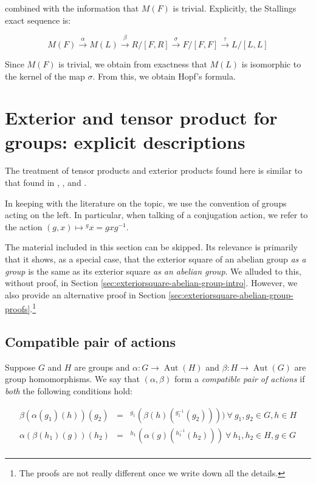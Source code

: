 \documentclass{ucetd}
\begin{document}
combined with the information that $M(F)$ is trivial. Explicitly,
the Stallings exact sequence is:

$$M(F) \stackrel{\alpha}{\to} M(L) \stackrel{\beta}{\to} R/[F,R] \stackrel{\sigma}{\to} F/[F,F] \stackrel{\tau}{\to} L/[L,L]$$

Since $M(F)$ is trivial, we obtain from exactness that $M(L)$ is
isomorphic to the kernel of the map $\sigma$. From this, we obtain
Hopf's formula.

\section{Exterior and tensor product for groups: explicit descriptions}\label{sec:exterior-and-tensor-product}

The treatment of tensor products and exterior products found here is
similar to that found in \cite{BrownLoday}, \cite{McDermottThesis},
and \cite{Ellis87}.

In keeping with the literature on the topic, we use the convention of
groups acting on the left. In particular, when talking of a
conjugation action, we refer to the action $(g,x) \mapsto {}^gx = gxg^{-1}$.

The material included in this section can be skipped. Its relevance is
primarily that it shows, as a special case, that the exterior square
of an abelian group {\em as a group} is the same as its exterior
square {\em as an abelian group}. We alluded to this, without proof,
in Section \ref{sec:exteriorsquare-abelian-group-intro}. However, we
also provide an alternative proof in Section
\ref{sec:exteriorsquare-abelian-group-proofs}.\footnote{The proofs are
  not really different once we write down all the details.}

\subsection{Compatible pair of actions}

Suppose $G$ and $H$ are groups and $\alpha: G \to
\operatorname{Aut}(H)$ and $\beta: H \to \operatorname{Aut}(G)$ are
group homomorphisms. We say that $(\alpha,\beta)$ form a {\em
  compatible pair of actions} if {\em both} the following conditions
hold:

\begin{eqnarray*}
  \beta(\alpha(g_1)(h))(g_2) & = & {}^{g_1}(\beta(h)({}^{g_1^{-1}}(g_2)))) \ \forall \ g_1,g_2 \in G, h \in H\\
  \alpha(\beta(h_1)(g))(h_2) & = & {}^{h_1}(\alpha(g)({}^{h_1^{-1}}(h_2))) \ \forall \ h_1,h_2 \in H, g \in G\\
\end{eqnarray*}
\end{document}
